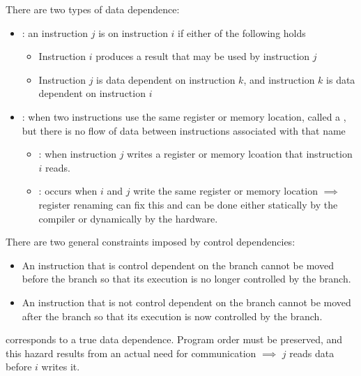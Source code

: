 \documentclass[12pt]{scrartcl}
\begin{document}
\begin{definition}
  There are two types of data dependence: 
  \begin{itemize}
    \item {}: an instruction $j$ is  on instruction $i$ if either of the following holds
    \begin{itemize}
      \item Instruction $i$ produces a result that may be used by instruction $j$
      \item Instruction $j$ is data dependent on instruction $k$, and instruction $k$ is data dependent on instruction $i$
    \end{itemize}
    \item {}: when two instructions use the same register or memory location, called a , but there 
    is no flow of data between instructions associated with that name 
    \begin{itemize}
      \item {}: when instruction $j$ writes a register or memory lcoation that instruction $i$ reads. 
      \item {}: occurs when $i$ and $j$ write the same register or memory location $\implies$ register renaming can fix this and can be done either statically by the compiler or dynamically by the hardware. 
    \end{itemize}
  \end{itemize}
\end{definition}

\begin{definition}
  There are two general constraints imposed by control dependencies: 
  \begin{itemize}
    \item An instruction that is control dependent on the branch cannot be moved before the branch so that its 
    execution is no longer controlled by the branch. 
    \item An instruction that is not control dependent on the branch cannot be moved after the branch so that its execution 
    is now controlled by the branch. 
  \end{itemize}
\end{definition}

\begin{definition}
   corresponds to a true data dependence. Program order must be preserved, and this hazard 
  results from an actual need for communication $\implies$ $j$ reads data before $i$ writes it. 
\end{definition}
\end{document}
